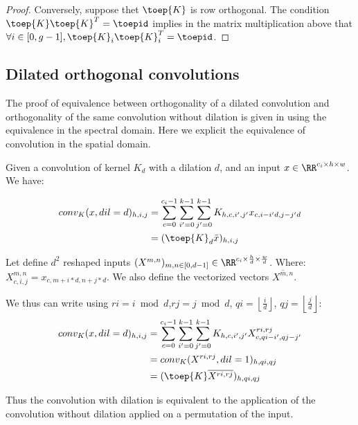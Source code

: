 \begin{proof}
    Conversely, suppose thet $\toep{K}$ is row orthogonal. The condition $\toep{K}\toep{K}^T=\toepid$ implies in the matrix multiplication above that $\forall i\in[0,g-1], \toep{K}_i\toep{K}_i^T=\toepid$.
    \end{proof}
    


\subsection{Dilated orthogonal convolutions}
\label{sec:ap_proof_dilated}

The proof of equivalence between orthogonality of a dilated convolution and orthogonality of the same convolution without dilation is given in \cite{su_scaling-up_2021} using the equivalence in the spectral domain. Here we explicit the equivalence of convolution in the spatial domain.

Given a convolution of kernel $K_d$ with a dilation $d$, and an input $x\in\RR^{c_i\times h \times w}$. We have:%

\begin{align*}
conv_K(x,dil=d)_{h,i,j} &= \sum_{c = 0}^{c_{i}-1} \sum_{i' = 0}^{k - 1} \sum_{j' = 0}^{k - 1} K_{h,c,i',j'}x_{c,i-i'd,j-j'd} \\
&= (\toep{K}_d\bar{x})_{h,i,j}
\end{align*}

Let define $d^2$ reshaped inputs $(X^{m,n})_{m,n\in[0,d-1]}\in\RR^{c_i\times \frac{h}{d}\times \frac{w}{d}}$. Where:
$X^{m,n}_{c,i,j}= x_{c,m+i*d,n+j*d}$. We also define the vectorized vectors $\overline{X^{m,n}}$.

We thus can write using $ri = i\bmod d$,$rj = j\bmod d$, $qi = \left\lfloor \frac{i}{d} \right\rfloor$, $qj = \left\lfloor \frac{j}{d} \right\rfloor$:
\begin{align*}
conv_K(x,dil=d)_{h,i,j} &=\sum_{c = 0}^{c_{i}-1} \sum_{i' = 0}^{k - 1} \sum_{j' = 0}^{k - 1} K_{h,c,i',j'}X^{ri,rj}_{c,qi-i',qj-j'}\\
&= conv_K(X^{ri,rj},dil=1)_{h,qi,qj} \\
&= (\toep{K}\overline{X^{ri,rj}})_{h,qi,qj}
\end{align*}

Thus the convolution with dilation is equivalent to the application of the convolution without dilation applied on a permutation of the input. 
